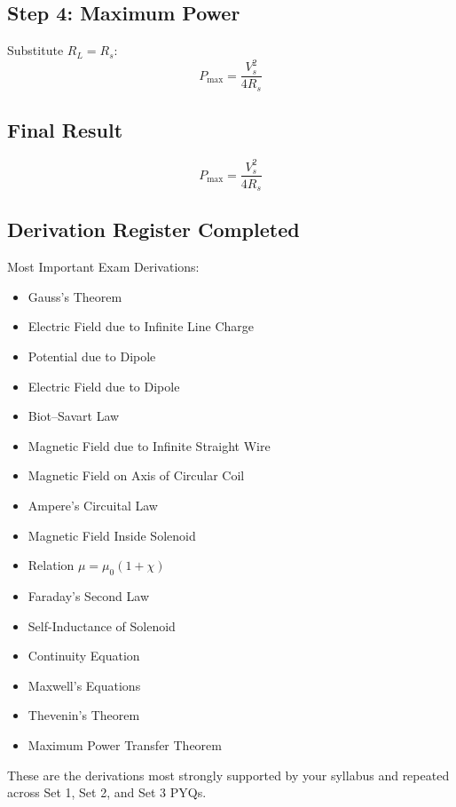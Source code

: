 \documentclass[11pt,a4paper]{article}
\begin{document}
\subsection*{Step 4: Maximum Power}
Substitute \( R_L = R_s \):
\[ P_{\text{max}} = \frac{V_s^2}{4R_s} \]

\subsection*{Final Result}
\begin{tcolorbox}[colback=RoyalBlue!5!white, colframe=RoyalBlue]
    \[ P_{\text{max}} = \frac{V_s^2}{4R_s} \]
\end{tcolorbox}

\subsection*{Derivation Register Completed}
Most Important Exam Derivations:
\begin{itemize}
    \item[\checkmark] Gauss's Theorem
    \item[\checkmark] Electric Field due to Infinite Line Charge
    \item[\checkmark] Potential due to Dipole
    \item[\checkmark] Electric Field due to Dipole
    \item[\checkmark] Biot--Savart Law
    \item[\checkmark] Magnetic Field due to Infinite Straight Wire
    \item[\checkmark] Magnetic Field on Axis of Circular Coil
    \item[\checkmark] Ampere's Circuital Law
    \item[\checkmark] Magnetic Field Inside Solenoid
    \item[\checkmark] Relation \( \mu = \mu_0(1+\chi) \)
    \item[\checkmark] Faraday's Second Law
    \item[\checkmark] Self-Inductance of Solenoid
    \item[\checkmark] Continuity Equation
    \item[\checkmark] Maxwell's Equations
    \item[\checkmark] Thevenin's Theorem
    \item[\checkmark] Maximum Power Transfer Theorem
\end{itemize}
These are the derivations most strongly supported by your syllabus and repeated across Set 1, Set 2, and Set 3 PYQs.
\end{document}

